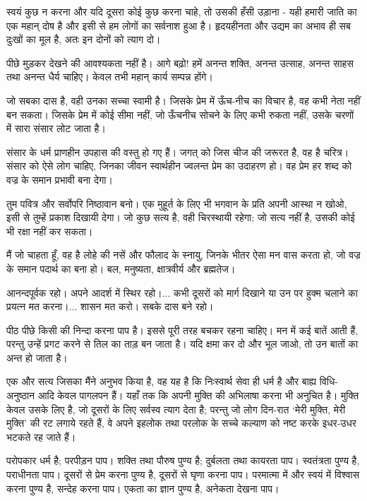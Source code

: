 स्वयं कुछ न करना और यदि दूसरा कोई कुछ करना चाहे, तो उसकी हँसी उड़ाना - यही हमारी जाति का एक महान् दोष है और इसी से हम लोगों का सर्वनाश हुआ है। हृदयहीनता और उद्यम का अभाव ही सब दुःखों का मूल है, अतः इन दोनों को त्याग दो। 

पीछे मुड़कर देखने की आवश्यकता नहीं है। आगे बढ़ो! हमें अनन्त शक्ति, अनन्त उत्साह, अनन्त साहस तथा अनन्त धैर्य चाहिए। केवल तभी महान् कार्य सम्पन्न होंगे। 

जो सबका दास है, वही उनका सच्चा स्वामी है। जिसके प्रेम में ऊँच-नीच का विचार है, वह कभी नेता नहीं बन सकता। जिसके प्रेम में कोई सीमा नहीं, जो ऊँचनीच सोचने के लिए कभी रुकता नहीं, उसके चरणों में सारा संसार लोट जाता है। 

संसार के धर्म प्राणहीन उपहास की वस्तु हो गए हैं। जगत् को जिस चीज की जरूरत है, वह है चरित्र। संसार को ऐसे लोग चाहिए, जिनका जीवन स्वार्थहीन ज्वलन्त प्रेम का उदाहरण हो। वह प्रेम हर शब्द को वज्र के समान प्रभावी बना देगा। 

तुम पवित्र और सर्वोपरि निष्ठावान बनो। एक मुहूर्त के लिए भी भगवान के प्रति अपनी आस्था न खोओ, इसी से तुम्हें प्रकाश दिखायी देगा। जो कुछ सत्य है, वही चिरस्थायी रहेगा; जो सत्य नहीं है, उसकी कोई भी रक्षा नहीं कर सकता। 

मैं जो चाहता हूँ, वह है लोहे की नसें और फौलाद के स्नायु, जिनके भीतर ऐसा मन वास करता हो, जो वज्र के समान पदार्थ का बना हो। बल, मनुष्यता, क्षात्रवीर्य और ब्रह्मतेज। 

आनन्दपूर्वक रहो। अपने आदर्श में स्थिर रहो।... कभी दूसरों को मार्ग दिखाने या उन पर हुक्म चलाने का प्रयत्न मत करना।... शासन मत करो। सबके दास बने रहो। 

पीठ पीछे किसी की निन्दा करना पाप है। इससे पूरी तरह बचकर रहना चाहिए। मन में कई बातें आती हैं, परन्तु उन्हें प्रगट करने से तिल का ताड़ बन जाता है। यदि क्षमा कर दो और भूल जाओ, तो उन बातों का अन्त हो जाता है। 

एक और सत्य जिसका मैंने अनुभव किया है, वह यह है कि निःस्वार्थ सेवा ही धर्म है और बाह्य विधि-अनुष्ठान आदि केवल पागलपन हैं। यहाँ तक कि अपनी मुक्ति की अभिलाषा करना भी अनुचित है। मुक्ति केवल उसके लिए है, जो दूसरों के लिए सर्वस्व त्याग देता है; परन्तु जो लोग दिन-रात ‘मेरी मुक्ति, मेरी मुक्ति’ की रट लगाये रहते हैं, वे अपने इहलोक तथा परलोक के सच्चे कल्याण को नष्ट करके इधर-उधर भटकते रह जाते हैं। 

परोपकार धर्म है; परपीड़न पाप। शक्ति तथा पौरुष पुण्य है; दुर्बलता तथा कायरता पाप। स्वतंत्रता पुण्य है, पराधीनता पाप। दूसरों से प्रेम करना पुण्य है, दूसरों से घृणा करना पाप। परमात्मा में और स्वयं में विश्वास करना पुण्य है, सन्देह करना पाप। एकता का ज्ञान पुण्य है, अनेकता देखना पाप। 

